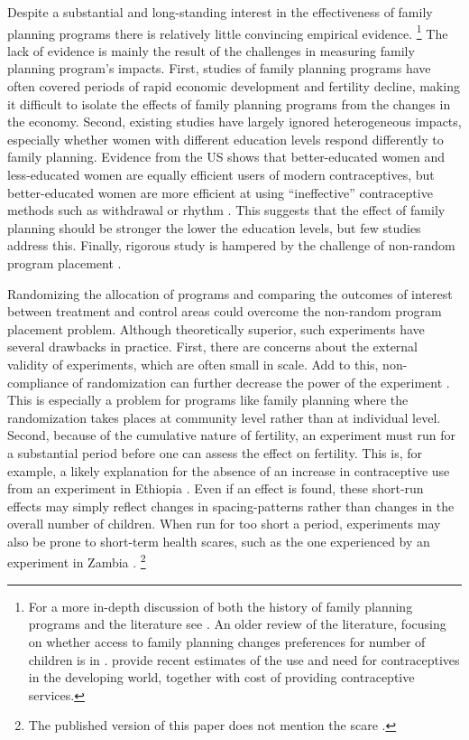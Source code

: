\documentclass[letterpaper,12pt]{article}
\begin{document}
Despite a substantial and long-standing interest in the effectiveness 
of family planning programs there is relatively little convincing 
empirical evidence.%
\footnote{
For a more in-depth discussion of both the history of family planning
programs and the literature see \citet{Miller2016}.
An older review of the literature, focusing on whether access to
family planning changes preferences for number of children is
in \citet{Freedman1997}.
\citet{Singh2012} provide recent estimates of the use and need for
contraceptives in the developing world, together with cost of 
providing contraceptive services.
}
The lack of evidence is mainly the result of the challenges in measuring 
family planning program's impacts.
First, studies of family planning programs have often covered periods of 
rapid economic development and fertility decline, making it difficult to
isolate the effects of family planning programs from the changes in the
economy.
Second, existing studies have largely ignored heterogeneous impacts,
especially whether women with different education levels respond
differently to family planning.
Evidence from the US shows that better-educated women and less-educated
women are equally efficient users of modern contraceptives, but
better-educated women are more efficient at using ``ineffective'' 
contraceptive methods such as withdrawal or rhythm \citep{Rosenzweig1989}.
This suggests that the effect of family planning should be stronger the 
lower the education levels, but few studies address this.
Finally, rigorous study is hampered by the challenge of non-random program 
placement \citep{rosenzweig86,pitt93}.


Randomizing the allocation of programs and comparing the outcomes of 
interest between treatment and control areas could overcome the non-random 
program placement problem.
Although theoretically superior, such experiments have several drawbacks in practice.
First, there are concerns about the external validity of experiments, which
are often small in scale.
Add to this, non-compliance of randomization can further decrease
the power of the experiment \citep{Desai2011}.
This is especially a problem for programs like family planning where the 
randomization takes places at community level rather than at individual level.
Second, because of the cumulative nature of fertility, an experiment must 
run for a substantial period before one can assess the effect on 
fertility.
This is, for example, a likely explanation for the absence of an 
increase in contraceptive use from an experiment in Ethiopia \citep{Desai2011}.
Even if an effect is found, these short-run effects may simply 
reflect changes in spacing-patterns rather than
changes in the overall number of children.
When run for too short a period, experiments may also be prone to short-term 
health scares, such as the one experienced by an experiment in 
Zambia \citep{Ashraf2009}.%
\footnote{
The published version of this paper does not mention the scare \citep{Ashraf2014}.
}
\end{document}
